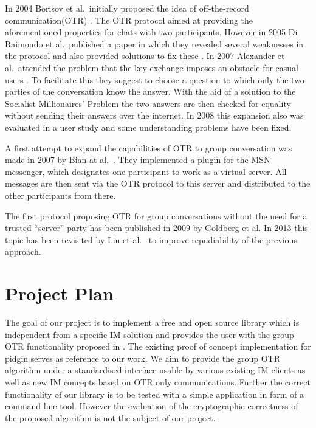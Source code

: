 In 2004 Borisov et al.\ initially proposed the idea of off-the-record
communication(OTR) \cite{otr}. The OTR protocol aimed at providing the
aforementioned properties for chats with two participants. However in 2005 Di
Raimondo et al.\ published a paper in which they revealed several weaknesses in
the protocol and also provided solutions to fix these \cite{sec-otr}. In 2007
Alexander et al.\ attended the problem that the key exchange imposes an obstacle
for casual users \cite{auth-otr}. To facilitate this they suggest to choose a question to which
only the two parties of the conversation know the answer. With the aid of a solution
to the Socialist Millionaires’ Problem the two answers are then checked for equality without sending their answers over the internet.
In 2008 this expansion also was evaluated\cite{user-study} in a user study and some understanding problems have been fixed.

A first attempt to expand the capabilities of OTR to group conversation was made in 2007 by Bian at al.\ \cite{gotr}. They implemented a plugin for the MSN messenger, which designates one participant to work as a virtual server. All messages are then sent via the OTR protocol to this server and distributed to the other participants from there.

The first protocol proposing OTR for group conversations without the need for a
trusted “server” party\cite{mp-otr} has been published in 2009 by Goldberg et
al. In 2013 this topic has been revisited by Liu et al.\ \cite{impr-gotr} to
improve repudiability of the previous approach.

\section{Project Plan}

The goal of our project is to implement a free and open source library which is
independent from a specific IM solution and provides the user with the group OTR
functionality proposed in \cite{impr-gotr}. The existing proof of concept
implementation for pidgin serves as reference to our work. We aim to provide the
group OTR algorithm under a standardised interface usable by various existing IM
clients as well as new IM concepts based on OTR only communications. Further the
correct functionality of our library is to be tested with a simple application in form of a command line tool.
However the evaluation of the cryptographic correctness of the proposed
algorithm is not the subject of our project.

